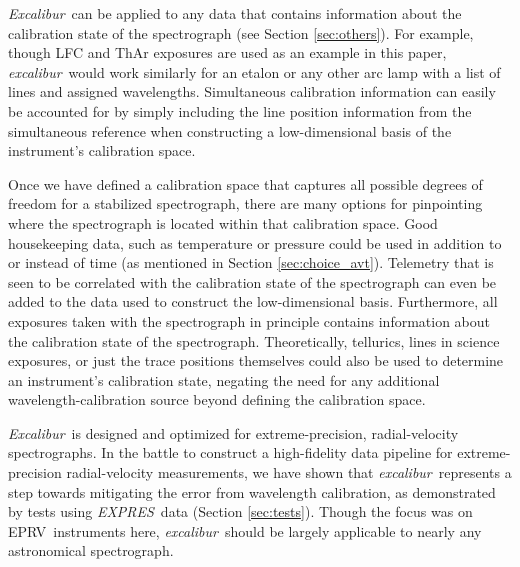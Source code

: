 \documentclass[modern]{aastex63}
\newcommand{\project}[1]{\textsl{#1}}
\newcommand{\name}{\project{excalibur}}
\newcommand{\Name}{\project{Excalibur}}
\newcommand{\acronym}[1]{{\small{#1}}}
\newcommand{\expres}{\project{\acronym{EXPRES}}}
\newcommand{\eprv}{\acronym{EPRV}}
\begin{document}
\Name\ can be applied to any data that contains information about the calibration state of the spectrograph (see Section \ref{sec:others}).  For example, though LFC and ThAr exposures are used as an example in this paper, \name\ would work similarly for an etalon or any other arc lamp with a list of lines and assigned wavelengths.  Simultaneous calibration information can easily be accounted for by simply including the line position information from the simultaneous reference when constructing a low-dimensional basis of the instrument's calibration space.

Once we have defined a calibration space that captures all possible degrees of freedom for a stabilized spectrograph, there are many options for pinpointing where the spectrograph is located within that calibration space.  Good housekeeping data, such as temperature or pressure could be used in addition to or instead of time (as mentioned in Section \ref{sec:choice_avt}).  Telemetry that is seen to be correlated with the calibration state of the spectrograph can even be added to the data used to construct the low-dimensional basis.  Furthermore, all exposures taken with the spectrograph in principle contains information about the calibration state of the spectrograph.  Theoretically, tellurics, lines in science exposures, or just the trace positions themselves could also be used to determine an instrument's calibration state, negating the need for any additional wavelength-calibration source beyond defining the calibration space.

\Name\ is designed and optimized for extreme-precision, radial-velocity spectrographs.  In the battle to construct a high-fidelity data pipeline for extreme-precision radial-velocity measurements, we have shown that \name\ represents a step towards mitigating the error from wavelength calibration, as demonstrated by tests using \expres\ data (Section \ref{sec:tests}).  Though the focus was on \eprv\ instruments here, \name\ should be largely applicable to nearly any astronomical spectrograph.


\end{document}

